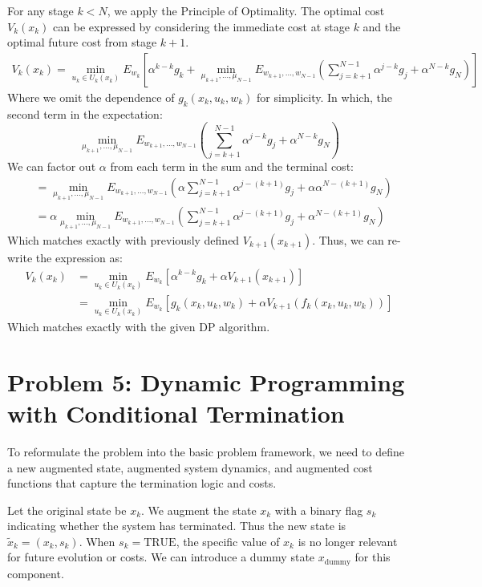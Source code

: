 \documentclass[11pt, a4paper, oneside]{memoir}
\begin{document}
For any stage $k < N$, we apply the Principle of Optimality. The optimal cost $V_k(x_k)$ can be expressed by considering the immediate cost at stage $k$ and the optimal future cost from stage $k+1$.
\begin{align*}
  V_k(x_k) = \min_{u_k \in U_k(x_k)} E_{w_k} \left[ \alpha^{k-k} g_k + \min_{\mu_{k+1}, \dots, \mu_{N-1}} E_{w_{k+1}, \dots, w_{N-1}} \left( \sum_{j=k+1}^{N-1} \alpha^{j-k} g_j + \alpha^{N-k} g_N \right) \right]
\end{align*}
Where we omit the dependence of $g_k(x_k, u_k, w_k)$ for simplicity. In which, the second term in the expectation:
\[ \min_{\mu_{k+1}, \dots, \mu_{N-1}} E_{w_{k+1}, \dots, w_{N-1}} \left( \sum_{j=k+1}^{N-1} \alpha^{j-k} g_j + \alpha^{N-k} g_N \right) \]
We can factor out $\alpha$ from each term in the sum and the terminal cost:
\begin{align*}
   & = \min_{\mu_{k+1}, \dots, \mu_{N-1}} E_{w_{k+1}, \dots, w_{N-1}} \left( \alpha \sum_{j=k+1}^{N-1} \alpha^{j-(k+1)} g_j + \alpha \alpha^{N-(k+1)} g_N \right) \\
   & = \alpha \min_{\mu_{k+1}, \dots, \mu_{N-1}} E_{w_{k+1}, \dots, w_{N-1}} \left( \sum_{j=k+1}^{N-1} \alpha^{j-(k+1)} g_j + \alpha^{N-(k+1)} g_N \right)
\end{align*}
Which matches exactly with previously defined $V_{k+1}(x_{k+1})$.
Thus, we can re-write the expression as:
\begin{align*}
  V_k(x_k) & = \min_{u_k \in U_k(x_k)} E_{w_k} \left[ \alpha^{k-k} g_k + \alpha V_{k+1}(x_{k+1}) \right]              \\
           & = \min_{u_k \in U_k(x_k)} E_{w_k} \left[ g_k(x_k, u_k, w_k) + \alpha V_{k+1}(f_k(x_k, u_k, w_k)) \right]
\end{align*}
Which matches exactly with the given DP algorithm.

\chapter{Problem 5: Dynamic Programming with Conditional Termination}
To reformulate the problem into the basic problem framework,
we need to define a new augmented state, augmented system dynamics,
and augmented cost functions that capture the termination logic and costs.

Let the original state be $x_k$. We augment the state $x_k$ with a binary flag $s_k$ indicating whether the system has terminated.
Thus the new state is $\tilde{x}_k = (x_k, s_k)$.
When $s_k = \text{TRUE}$, the specific value of $x_k$ is no longer relevant for future evolution or costs.
We can introduce a dummy state $x_{\text{dummy}}$ for this component.
\end{document}

